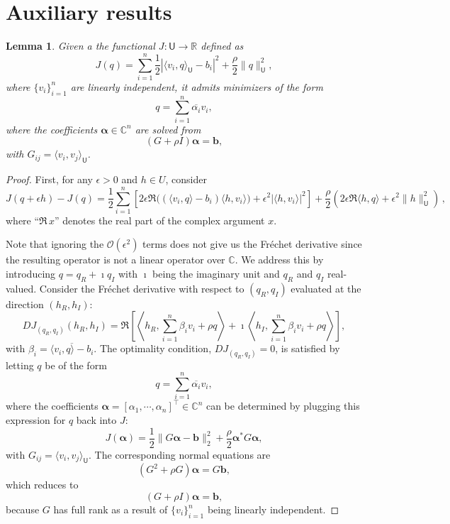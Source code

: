 \documentclass[12pt]{amsart}
\newtheorem{lma}{Lemma}
\begin{document}
\section{Auxiliary results}
\begin{lma}\label{lemma:optimality}
Given a the functional $J : \mathsf{U}\rightarrow \mathbb{R}$ defined as
\[
J(q) = \sum_{i=1}^n  {\textstyle\frac{1}{2}}|\langle v_i, q \rangle_{\mathsf{U}} - b_i|^2 +  {\textstyle\frac{\rho}{2}} \|q\|_{\mathsf{U}}^2,
\]
where $\{v_i\}_{i=1}^n$ are linearly independent, it admits minimizers of the form
\[
q = \sum_{i=1}^n \overline{\alpha_i} v_i,
\]
where the coefficients $\boldsymbol{\alpha} \in \mathbb{C}^n$ are solved from
\[
\left(G + \rho I\right)\boldsymbol{\alpha} = \mathbf{b},
\]
with $G_{ij} = \langle v_i, v_j\rangle_\mathsf{U}$.
\end{lma}
\begin{proof}
First, for any $\epsilon>0$ and $h\in U$, consider
\[
J(q + \epsilon h) - J(q) =  {\textstyle\frac{1}{2}}\sum_{i=1}^n \left[ {2} \epsilon \Re  \Big(\left(\langle v_i, q \rangle -  b_i\right)\langle h, v_i\rangle\Big) + \epsilon^2 |\langle h, v_i \rangle|^2\right] +  {\textstyle\frac{\rho}{2}}\left( {2}\epsilon \Re  \langle h, q\rangle + \epsilon^2 \|h\|_\mathsf{U}^2\right)\,,
\]
where ``$\Re\, x $'' denotes the real part of the complex argument $x$.

Note that ignoring the $\mathcal{O}(\epsilon^2)$ terms does not give us the Fr\'echet derivative since the resulting operator is not a linear operator over $\mathbb{C}$. We address this by introducing $q = q_R + \imath q_I$ with $\imath$ being the imaginary unit and $q_R$ and $q_I$ real-valued. Consider the Fr\'echet derivative with respect to $(q_R, q_I)$ evaluated at the direction $(h_R , h_I)$:
\[
DJ_{(q_R,q_I)}(h_R,h_I) = \Re\left[\left\langle h_R, \sum_{i=1}^n \beta_i v_i + \rho q \right\rangle + \imath \left\langle h_I,\sum_{i=1}^n \beta_i v_i + \rho q \right\rangle\right],
\]
with $\beta_i = \overline{\langle v_i, q \rangle -  b_i}$. The optimality condition, $DJ_{(q_R,q_I)} = 0$, is satisfied by letting $q$ be of the form
\[
q = \sum_{i=1}^n \overline{\alpha_i} v_i,
\]
where the coefficients $\boldsymbol{\alpha} = [\alpha_1,\cdots,\alpha_n]^\top \in \mathbb{C}^n$ can be determined by plugging this expression for $q$ back into $J$:
\[
J(\boldsymbol{\alpha}) =  {\textstyle\frac{1}{2}}\|G\boldsymbol{\alpha} - \mathbf{b}\|_2^2 +  {\textstyle\frac{\rho}{2}}\boldsymbol{\alpha}^*G\boldsymbol{\alpha},
\]
with $G_{ij} = \langle v_i, v_j\rangle_\mathsf{U}$.
The corresponding normal equations are
\[
\left(G^2 + \rho G\right)\boldsymbol{\alpha} = G\mathbf{b},
\]
which reduces to
\[
\left(G+ \rho I\right)\boldsymbol{\alpha} = \mathbf{b},
\]
because $G$ has full rank as a result of $\{v_i\}_{i=1}^n$ being linearly independent.
\end{proof}
\end{document}
